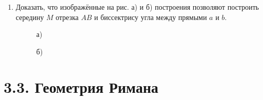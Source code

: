 \begin{enumerate}[resume*]
		\item Доказать, что изображённые на рис. а) и б) построения позволяют построить середину $M$ отрезка $AB$ и биссектрису угла между прямыми $a$ и $b$.

		\begin{figure}[H]
			\centering
		\begin{minipage}{0.45\textwidth}
			\centering
			а)
			\def\svgwidth{\columnwidth}
			{\Large \scalebox{0.7}{}}
		\end{minipage}
		\hfill %
		\begin{minipage}{0.45\textwidth}
			\centering
			б)
			\def\svgwidth{\columnwidth}
			{\Huge \scalebox{0.7}{}}
		\end{minipage}
				
		\end{figure}
	\end{enumerate}
 
	\section{3.3. Геометрия Римана}
 
